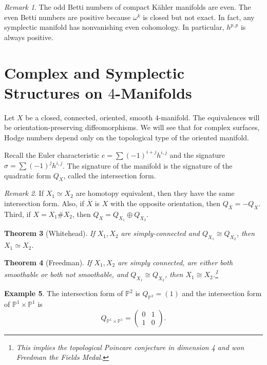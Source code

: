 \documentclass[leqno, openany]{memoir}
\newtheorem{thm}{Theorem}[chapter]
\theoremstyle{definition}
\newtheorem{exm}[thm]{Example}
\theoremstyle{remark}
\newtheorem{rmk}[thm]{Remark}
\theoremstyle{plain}
\theoremstyle{definition}
\theoremstyle{remark}
\renewcommand{\P}{\mathbb{P}}
\begin{document}
\begin{rmk}
    The odd Betti numbers of compact K\"ahler manifolds are even. The even Betti numbers are positive because $\omega^k$ is closed but not exact. In fact, any symplectic manifold has nonvanishing even cohomology. In particular, $h^{p,p}$ is always positive.
\end{rmk}

\section{Complex and Symplectic Structures on $4$-Manifolds}%
\label{sec:topology_of_complex_surfaces}

Let $X$ be a closed, connected, oriented, smooth $4$-manifold. The equivalences will be orientation-preserving diffeomorphisms. We will see that for complex surfaces, Hodge numbers depend only on the topological type of the oriented manifold.

Recall the Euler characteristic $e = \sum (-1)^{i+j} h^{i,j}$ and the signature $\sigma = \sum (-1)^j h^{i,j}$. The signature of the manifold is the signature of the quadratic form $Q_X$, called the intersection form.

\begin{rmk}
    If $X_1 \simeq X_2$ are homotopy equivalent, then they have the same intersection form. Also, if $\overline{X}$ is $X$ with the opposite orientation, then $Q_{\overline{X}} = -Q_X$. Third, if $X = X_1 \# X_2$, then $Q_X = Q_{X_1} \oplus Q_{X_2}$.
\end{rmk}

\begin{thm}[Whitehead]
    If $X_1, X_2$ are simply-connected and $Q_{X_1} \cong Q_{X_2}$, then $X_1 \simeq X_2$.
\end{thm}

\begin{thm}[Freedman]
    If $X_1, X_2$ are simply connected, are either both smoothable or both not smoothable, and $Q_{X_1} \cong Q_{X_2}$, then $X_1 \cong X_2$.\footnote{This implies the topological Poincare conjecture in dimension 4 and won Freedman the Fields Medal.}
\end{thm}

\begin{exm}
    The intersection form of $\P^2$ is $Q_{\P^2} = (1)$ and the intersection form of $\P^1 \times \P^1$ is 
    \[Q_{\P^1 \times \P^1} = \begin{pmatrix}
        0 & 1 \\
        1 & 0
    \end{pmatrix}.\]
\end{exm}
\end{document}
